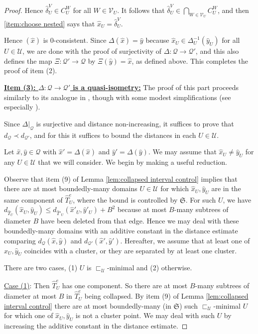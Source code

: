 \documentclass{amsart}
\theoremstyle{definition}
\theoremstyle{remark}
\theoremstyle{definition}
\newcommand{\calQ}{\mathcal{Q}}
\newcommand{\calU}{\mathcal{U}}
\newcommand{\calV}{\mathcal{V}}
\newcommand{\hT}{\widehat{T}}
\newcommand{\hx}{\hat{x}}
\newcommand{\hy}{\hat{y}}
\newcommand{\hd}{\hat{\delta}}
\newcommand{\nest}{\sqsubset}
\begin{document}
\begin{proof}
Hence $\hd^V_U \in C^W_U$ for all $W \in \calV_U$.  It follows that $\hd^V_U \in \bigcap_{W \in \calV_U} C^W_U$, and then \eqref{item:choose nested} says that $\hx_U = \hd^V_U$.



\vspace{.1in}

Hence $(\hx)$ is $0$-consistent.  Since $\Delta(\hx) = \hy$ because $\hx_U \in \Delta^{-1}_U(\hy_U)$ for all $U \in \calU$, we are done with the proof of surjectivity of $\Delta: \calQ \to \calQ'$, and this also defines the map $\Xi:\calQ' \to \calQ$ by $\Xi(\hy) = \hx$, as defined above.  This completes the proof of item (2).

\medskip

\textbf{\underline{Item (3): $\Delta:\calQ \to \calQ'$ is a quasi-isometry:}} The proof of this part proceeds similarly to its analogue in \cite[Theorem 10.2]{Dur_infcube}, though with some modest simplifications (see especially \cite[Subsection 9.1]{Dur_infcube}).

Since $\Delta|_{\calQ}$ is surjective and distance non-increasing, it suffices to prove that $d_{\calQ} \prec d_{\calQ'}$, and for this it suffices to bound the distances in each $U \in \calU$.

Let $\hx, \hy \in \calQ$ with $\hx' = \Delta(\hx)$ and $\hy' = \Delta(\hy)$.  We may assume that $\hx_U \neq \hy_U$ for any $U\in \calU$ that we will consider.  We begin by making a useful reduction.

Observe that item (9) of Lemma \ref{lem:collapsed interval control} implies that there are at most boundedly-many domains $U \in \calU$ for which $\hx_U,\hy_U$ are in the same component of $\hT^e_U$, where the bound is controlled by $\mathfrak S$.  For such $U$, we have $d_{\hT_U}(\hx_U, \hy_U) \leq d_{\hT'_U}(\hx'_U, \hy'_U) + B^2$ because at most $B$-many subtrees of diameter $B$ have been deleted from that edge.  Hence we may deal with these boundedly-many domains with an additive constant in the distance estimate comparing $d_{\calQ}(\hx,\hy)$ and $d_{\calQ'}(\hx',\hy')$. Hereafter, we assume that at least one of $\hx_U, \hy_U$ coincides with a cluster, or they are separated by at least one cluster.



\smallskip

There are two cases, (1) $U$ is $\nest_{\calU}$-minimal and (2) otherwise.

\smallskip

\underline{Case (1)}: Then $\hT^e_U$ has one component.  So there are at most $B$-many subtrees of diameter at most $B$ in $\hT^e_U$ being collapsed.  By item (9) of Lemma \ref{lem:collapsed interval control} there are at most boundedly-many (in $\mathfrak S$) such $\nest_{\calU}$-minimal $U$ for which one of $\hx_U, \hy_U$ is not a cluster point.  We may deal with such $U$ by increasing the additive constant in the distance estimate.


\end{proof}
\end{document}
